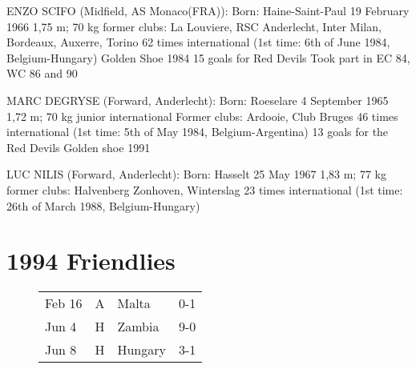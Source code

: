 ENZO SCIFO (Midfield, AS Monaco(FRA)):
Born: Haine-Saint-Paul 19 February 1966
1,75 m; 70 kg
former clubs: La Louviere, RSC Anderlecht, Inter Milan, Bordeaux, Auxerre, Torino
62 times international (1st time: 6th of June 1984, Belgium-Hungary)
Golden Shoe 1984
15 goals for Red Devils
Took part in EC 84, WC 86 and 90

MARC DEGRYSE (Forward, Anderlecht):
Born: Roeselare 4 September 1965
1,72 m; 70 kg
junior international
Former clubs: Ardooie, Club Bruges
46 times international (1st time: 5th of May 1984, Belgium-Argentina) 
13 goals for the Red Devils
Golden shoe 1991

LUC NILIS (Forward, Anderlecht):
Born: Hasselt 25 May 1967
1,83 m; 77 kg
former clubs: Halvenberg Zonhoven, Winterslag
23 times international (1st time: 26th of March 1988, Belgium-Hungary)
\section{1994 Friendlies}
\begin{figure}[H]
\begin{tabular}{l l l c}
Feb 16 & A & Malta & 0-1 \\
Jun 4 & H & Zambia & 9-0 \\
Jun 8 & H & Hungary & 3-1 \\
\end{tabular}
\end{figure}
